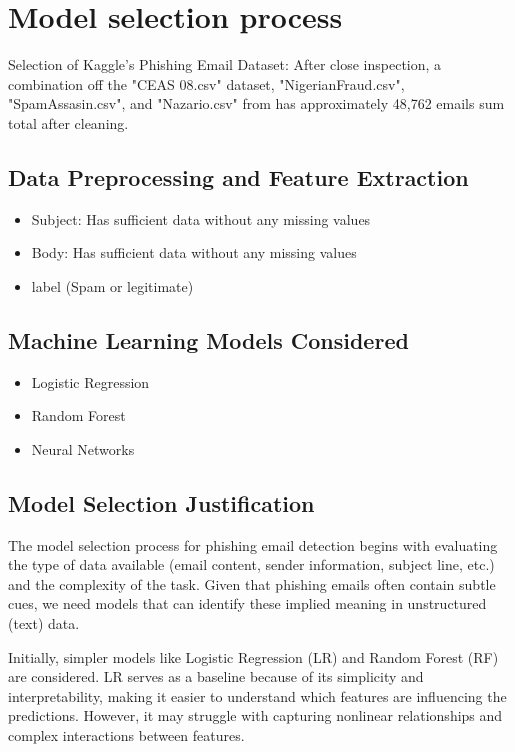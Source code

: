 \documentclass{article}
\begin{document}
\newpage

\section{Model selection process}
Selection of Kaggle's Phishing Email Dataset:
After close inspection, a combination off the "CEAS 08.csv" dataset, "NigerianFraud.csv", "SpamAssasin.csv", and "Nazario.csv" from has approximately 48,762 emails sum total after cleaning. 

\subsection{Data Preprocessing and Feature Extraction }

\begin{itemize}
    \item Subject: Has sufficient data without any missing values 
    \item Body: Has sufficient data without any missing values
    \item label (Spam or legitimate)
\end{itemize}


\subsection{Machine Learning Models Considered}
\begin{itemize}
    \item Logistic Regression
    \item Random Forest
    \item Neural Networks
\end{itemize}

\subsection{Model Selection Justification}
The model selection process for phishing email detection begins with evaluating the type of data available (email content, sender information, subject line, etc.) and the complexity of the task. Given that phishing emails often contain subtle cues, we need models that can identify these implied meaning in unstructured (text) data.

Initially, simpler models like Logistic Regression (LR) and Random Forest (RF) are considered. LR serves as a baseline because of its simplicity and interpretability, making it easier to understand which features are influencing the predictions. However, it may struggle with capturing nonlinear relationships and complex interactions between features.
\end{document}
